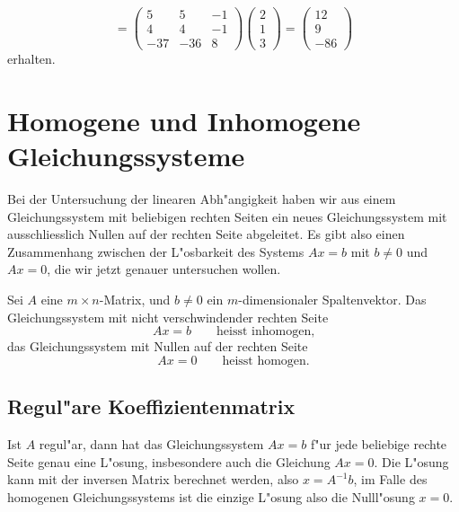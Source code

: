 \begin{beispiel}
\[=
\begin{pmatrix}
5&5&-1\\
4&4&-1\\
-37&-36&8
\end{pmatrix}
\begin{pmatrix}2\\1\\3\end{pmatrix}
=\begin{pmatrix}
12\\
9\\
-86
\end{pmatrix}
\]
erhalten.
\end{beispiel}

\section{Homogene und Inhomogene Gleichungssysteme}
Bei der Untersuchung der linearen Abh"angigkeit haben wir aus einem
Gleichungssystem mit beliebigen rechten Seiten ein neues Gleichungssystem
mit ausschliesslich Nullen auf der rechten Seite abgeleitet.
Es gibt also einen Zusammenhang zwischen der L"osbarkeit des Systems 
$Ax=b$ mit $b\ne 0$ und $Ax=0$, die wir jetzt genauer untersuchen
wollen.
\begin{definition}
Sei $A$ eine $m\times n$-Matrix, und $b\ne 0$ ein $m$-dimensionaler
Spaltenvektor.
Das Gleichungssystem mit nicht verschwindender rechten Seite
\[
Ax=b\qquad\text{heisst inhomogen,}
\]
das Gleichungssystem mit Nullen auf der rechten Seite 
\[
Ax=0\qquad\text{heisst homogen.}
\]
\end{definition}
\subsection{Regul"are Koeffizientenmatrix}
Ist $A$ regul"ar, dann hat das Gleichungssystem $Ax=b$ f"ur jede beliebige
rechte Seite genau eine L"osung, insbesondere auch die Gleichung $Ax=0$.
Die L"osung kann mit der inversen Matrix berechnet werden, also $x=A^{-1}b$,
im Falle des homogenen Gleichungssystems ist die einzige L"osung also
die Nulll"osung $x=0$.

